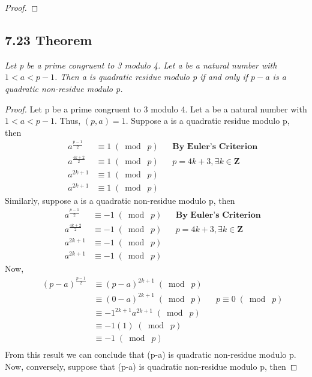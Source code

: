 \documentclass{article}
\begin{document}
\begin{proof}

\end{proof}

\subsection*{7.23 Theorem} 
\quad \textit{Let p be a prime congruent to 3 modulo 4. Let a be a natural number with $1<a<p-1$. Then a is quadratic residue modulo p if and only if $p-a$ is a quadratic non-residue modulo p.}

\begin{proof}
Let p be a prime congruent to 3 modulo 4. Let a be a natural number with $1<a<p-1$. Thus, $(p, a) = 1$. Suppose a is a quadratic residue modulo p, then
\begin{align*}
    &&a^{\frac{p-1}{2}} &\equiv 1 \;(\bmod\; p) && \textbf{By Euler's Criterion}\\
    &&a^{\frac{4k+2}{2}} &\equiv 1 \;(\bmod\; p) && p = 4k + 3, \exists k \in \mathbf{Z}\\
    &&a^{2k+1} &\equiv 1 \;(\bmod\; p) &&\\
    &&a^{2k+1} &\equiv 1 \;(\bmod\; p) &&
\end{align*}
Similarly, suppose a is a quadratic non-residue modulo p, then
\begin{align*}
    &&a^{\frac{p-1}{2}} &\equiv -1 \;(\bmod\; p) && \textbf{By Euler's Criterion}\\
    &&a^{\frac{4k+2}{2}} &\equiv -1 \;(\bmod\; p) && p = 4k + 3, \exists k \in \mathbf{Z}\\
    &&a^{2k+1} &\equiv -1 \;(\bmod\; p) &&\\
    &&a^{2k+1} &\equiv -1 \;(\bmod\; p) &&
\end{align*}
Now,
\begin{align*}
    &&(p-a)^{\frac{p-1}{2}} &\equiv (p-a)^{2k+1} \;(\bmod\; p) &&\\
    && &\equiv (0-a)^{2k+1} \;(\bmod\; p) && p \equiv 0 \;(\bmod\; p)\\
    && &\equiv -1^{2k+1}a^{2k+1} \;(\bmod\; p) && \\
    && &\equiv -1(1) \;(\bmod\; p) && \\
    && &\equiv -1 \;(\bmod\; p) && \\
\end{align*}
From this result we can conclude that (p-a) is quadratic non-residue modulo p.\\
Now, conversely, suppose that (p-a) is quadratic non-residue modulo p, then

\end{proof}
\end{document}
